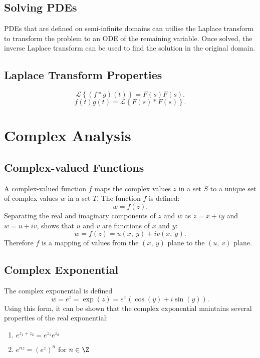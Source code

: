 \documentclass{article}
\begin{document}
\subsection{Solving PDEs}
PDEs that are defined on semi-infinite domains can utilise the Laplace
transform to transform the problem to an ODE of the remaining variable.
Once solved, the inverse Laplace transform can be used to find the
solution in the original domain.
\subsection{Laplace Transform Properties}
\begin{theorem}
    \begin{equation*}
        \mathscr{L}\left\{ \left( f \ast g \right)\left( t \right) \right\} = F\left( s \right) F\left( s \right).
    \end{equation*}
    \begin{equation*}
        f\left( t \right) g\left( t \right) = \mathscr{L}\left\{ F\left( s \right) \ast F\left( s \right) \right\}.
    \end{equation*}
\end{theorem}
\section{Complex Analysis}
\subsection{Complex-valued Functions}
A complex-valued function \(f\) maps the complex values \(z\) in a set
\(S\) to a unique set of complex values \(w\) in a set \(T\). The
function \(f\) is defined:
\begin{equation*}
    w = f\left( z \right).
\end{equation*}
Separating the real and imaginary components of \(z\) and \(w\) as
\(z = x + i y\) and \(w = u + i v\), shows that \(u\) and \(v\) are
functions of \(x\) and \(y\):
\begin{equation*}
    w = f\left( z \right) = u\left( x,\: y \right) + i v\left( x,\: y \right).
\end{equation*}
Therefore \(f\) is a mapping of values from the
\(\left( x,\: y \right)\) plane to the \(\left( u,\: v \right)\) plane.
\subsection{Complex Exponential}
The complex exponential is defined
\begin{equation*}
    w = e^z = \exp{\left( z \right)} = e^x \left( \cos{\left( y \right)} + i \sin{\left( y \right)} \right).
\end{equation*}
Using this form, it can be shown that the complex exponential maintains
several properties of the real exponential:
\begin{enumerate}
    \item \(e^{z_1 + z_2} = e^{z_1} e^{z_2}\)
    \item \(e^{n z} = \left( e^z \right)^n\) for \(n \in \Z\)
\end{enumerate}
\end{document}

